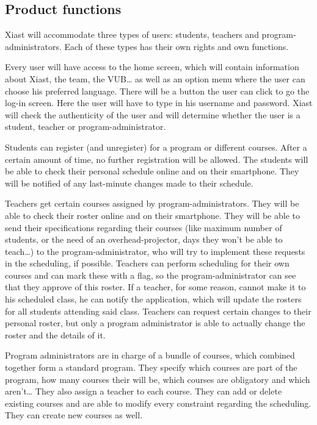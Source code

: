\documentclass[12pt]{article}
\begin{document}
\subsection{Product functions}\label{product-functions}

Xiast will accommodate three types of users: students, teachers and
program-administrators. Each of these types has their own rights and own
functions.

Every user will have access to the home screen, which will contain
information about Xiast, the team, the VUB\ldots{} as well as an option
menu where the user can choose his preferred language. There will be a
button the user can click to go the log-in screen. Here the user will
have to type in his username and password. Xiast will check the
authenticity of the user and will determine whether the user is a
student, teacher or program-administrator.

Students can register (and unregister) for a program or different
courses. After a certain amount of time, no further registration will be
allowed. The students will be able to check their personal schedule
online and on their smartphone. They will be notified of any last-minute
changes made to their schedule.

Teachers get certain courses assigned by program-administrators. They
will be able to check their roster online and on their smartphone. They
will be able to send their specifications regarding their courses (like
maximum number of students, or the need of an overhead-projector, days
they won't be able to teach\ldots{}) to the program-administrator, who
will try to implement these requests in the scheduling, if possible.
Teachers can perform scheduling for their own courses and can mark these
with a flag, so the program-administrator can see that they approve of
this roster. If a teacher, for some reason, cannot make it to his
scheduled class, he can notify the application, which will update the
rosters for all students attending said class. Teachers can request
certain changes to their personal roster, but only a program
administrator is able to actually change the roster and the details of
it.

Program administrators are in charge of a bundle of courses, which
combined together form a standard program. They specify which courses
are part of the program, how many courses their will be, which courses
are obligatory and which aren't\ldots{} They also assign a teacher to
each course. They can add or delete existing courses and are able to
modify every constraint regarding the scheduling. They can create new
courses as well.
\end{document}
